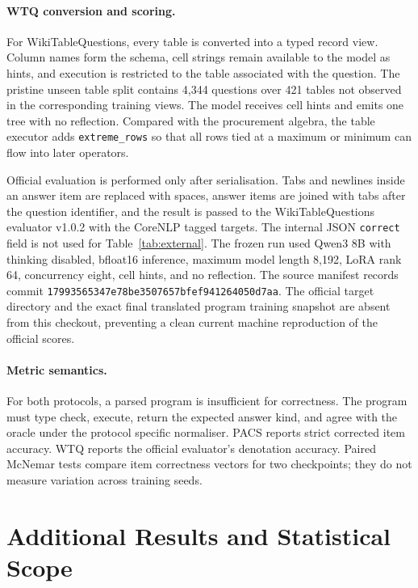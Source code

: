 \documentclass{article}
\begin{document}
\paragraph{WTQ conversion and scoring.}
For WikiTableQuestions, every table is converted into a typed record view.  Column names form the
schema, cell strings remain available to the model as hints, and execution is restricted to the
table associated with the question.  The pristine unseen table split contains 4,344 questions over
421 tables not observed in the corresponding training views.  The model receives cell hints and
emits one tree with no reflection.  Compared with the procurement algebra, the table executor adds
\texttt{extreme\_rows} so that all rows tied at a maximum or minimum can flow into later operators.

Official evaluation is performed only after serialisation.  Tabs and newlines inside an answer item
are replaced with spaces, answer items are joined with tabs after the question identifier, and the
result is passed to the WikiTableQuestions evaluator v1.0.2 with the CoreNLP tagged targets.  The
internal JSON \texttt{correct} field is not used for Table~\ref{tab:external}.  The frozen run used
Qwen3 8B with thinking disabled, bfloat16 inference, maximum model length 8,192, LoRA rank 64,
concurrency eight, cell hints, and no reflection.  The source manifest records commit
\nolinkurl{17993565347e78be3507657bfef941264050d7aa}.  The official target directory and the exact final
translated program training snapshot are absent from this checkout, preventing a clean current
machine reproduction of the official scores.

\paragraph{Metric semantics.}
For both protocols, a parsed program is insufficient for correctness.  The program must type check,
execute, return the expected answer kind, and agree with the oracle under the protocol specific
normaliser.  PACS reports strict corrected item accuracy.  WTQ reports the official evaluator's
denotation accuracy.  Paired McNemar tests compare item correctness vectors for two checkpoints;
they do not measure variation across training seeds.

\section{Additional Results and Statistical Scope}
\label{app:results}
\end{document}
